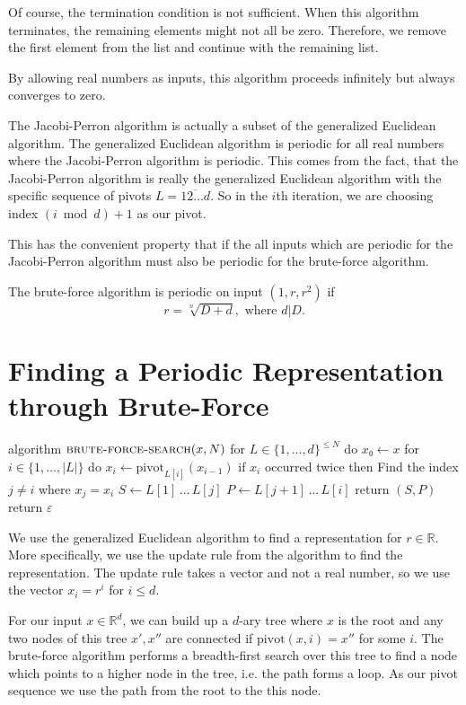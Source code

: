 Of course, the termination condition is not sufficient.
When this algorithm terminates, the remaining elements might not all be zero.
Therefore, we remove the first element from the list and continue with the
remaining list.

By allowing real numbers as inputs, this algorithm proceeds infinitely but
always converges to zero.

The Jacobi-Perron algorithm is actually a subset of the generalized Euclidean algorithm.
The generalized Euclidean algorithm is periodic for all real numbers where the Jacobi-Perron algorithm is periodic.
This comes from the fact, that the Jacobi-Perron algorithm is really the
generalized Euclidean algorithm with the specific sequence of pivots $L = \overline{12…d}$.
So in the $i$th iteration, we are choosing index $(i \bmod d) + 1$ as our pivot.

This has the convenient property that if the all inputs which are periodic for
the Jacobi-Perron algorithm must also be periodic for the brute-force algorithm.

\begin{theorem}
  The brute-force algorithm is periodic on input $(1, r, r^2)$ if
  \[
    r = \sqrt[n]{D + d}, \text{ where } d | D.
  \]
\end{theorem}

\section{Finding a Periodic Representation through Brute-Force}

\begin{Pseudocode}
algorithm $\textsc{brute-force-search}(x, N)$
  for $L ∈ \{1, …, d\}^{≤ N}$ do
    $x₀ ← x$
    for $i ∈ \{1, …, |L|\}$ do
      $x_i ← \mathrm{pivot}_{L[i]}(x_{i-1})$
      if $x_i$ occurred twice then
        Find the index $j ≠ i$ where $x_j = x_i$
        $S ← L[1] \,…\, L[j]$
        $P ← L[j+1] \,…\, L[i]$
        return $(S, P)$
  return $ε$
\end{Pseudocode}

We use the generalized Euclidean algorithm to find a representation for $r ∈ ℝ$.
More specifically, we use the update rule from the algorithm to find the representation.
The update rule takes a vector and not a real number, so we use the vector $x_i = r^i$ for $i ≤ d$.

For our input $x ∈ ℝ^d$, we can build up a $d$-ary tree where $x$ is the root and any
two nodes of this tree $x', x''$ are connected if $\mathrm{pivot}(x, i) = x''$
for some $i$.
The brute-force algorithm performs a breadth-first search over this tree to
find a node which points to a higher node in the tree, i.e. the path forms a loop.
As our pivot sequence we use the path from the root to the this node.

